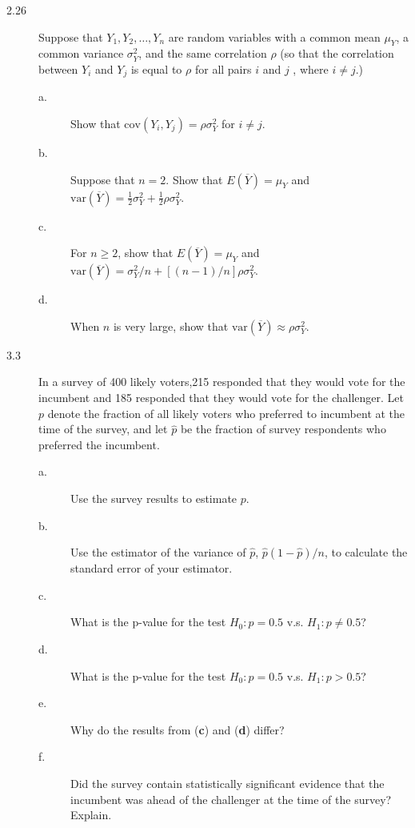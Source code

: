 \documentclass[a4paper,11pt]{article}
\newcommand{\var}{\mathrm{var}}
\newcommand{\cov}{\mathrm{cov}}
\begin{document}
\begin{description}
\item[{2.26}] Suppose that \(Y_1, Y_2, \ldots, Y_n\) are random variables with a
common mean \(\mu_Y\), a common variance \(\sigma^2_Y\), and the
same correlation \(\rho\) (so that the correlation between
\(Y_i\) and \(Y_j\) is equal to \(\rho\) for all pairs \(i\) and \(j\)
, where \(i \neq j\).)
\begin{description}
\item[{a.}] Show that \(\cov(Y_i, Y_j) = \rho\sigma^2_Y\) for \(i \neq j\).
\item[{b.}] Suppose that \(n=2\). Show that \(E(\overline{Y})=\mu_Y\) and
\(\var(\overline{Y}) = \frac{1}{2}\sigma^2_Y +
          \frac{1}{2}\rho\sigma^2_Y\).
\item[{c.}] For \(n \geq 2\), show that \(E(\overline{Y}) = \mu_Y\) and
\(\var(\overline{Y}) = \sigma^2_Y/n +
          [(n-1)/n]\rho\sigma^2_Y\).
\item[{d.}] When \(n\) is very large, show that \(\var(\overline{Y})
          \approx \rho\sigma^2_Y\).
\end{description}
\end{description}


\begin{description}
\item[{3.3}] In a survey of 400 likely voters,215 responded that they
would vote for the incumbent and 185 responded that they
would vote for the challenger. Let \(p\) denote the fraction of
all likely voters who preferred to incumbent at the time of
the survey, and let \(\hat{p}\) be the fraction of survey
respondents who preferred the incumbent.
\begin{description}
\item[{a.}] Use the survey results to estimate \(p\).
\item[{b.}] Use the estimator of the variance of \(\hat{p}\),
\(\hat{p}(1-\hat{p})/n\), to calculate the standard error of
your estimator.
\item[{c.}] What is the p-value for the test \(H_0: p=0.5\) v.s. \(H_1: p
          \neq 0.5\)?
\item[{d.}] What is the p-value for the test \(H_0: p=0.5\) v.s. \(H_1: p > 0.5\)?
\item[{e.}] Why do the results from (\textbf{c}) and (\textbf{d}) differ?
\item[{f.}] Did the survey contain statistically significant evidence
that the incumbent was ahead of the challenger at the time
of the survey? Explain.
\end{description}
\end{description}
\end{document}
